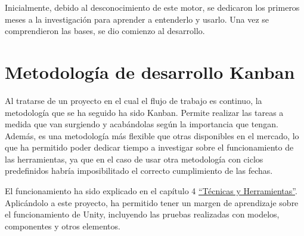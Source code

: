Inicialmente, debido al desconocimiento de este motor, se dedicaron los primeros meses a la investigación para aprender a entenderlo y usarlo. Una vez se comprendieron las bases, se dio comienzo al desarrollo.

\section{Metodología de desarrollo Kanban}

Al tratarse de un proyecto en el cual el flujo de trabajo es continuo, la metodología que se ha seguido ha sido Kanban. Permite realizar las tareas a medida que van surgiendo y acabándolas según la importancia que tengan. Además, es una metodología más flexible que otras disponibles en el mercado, lo que ha permitido poder dedicar tiempo a investigar sobre el funcionamiento de las herramientas, ya que en el caso de usar otra metodología con ciclos predefinidos habría imposibilitado el correcto cumplimiento de las fechas.

El funcionamiento ha sido explicado en el capítulo 4 \hyperref[cap:tecnicas]{``Técnicas y Herramientas''}. Aplicándolo a este proyecto, ha permitido tener un margen de aprendizaje sobre el funcionamiento de Unity, incluyendo las pruebas realizadas con modelos, componentes y otros elementos.

